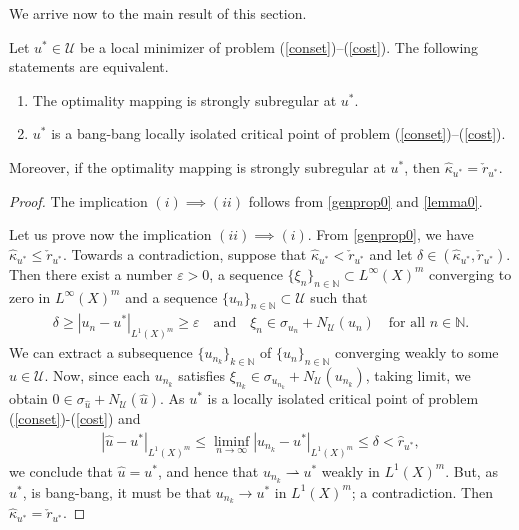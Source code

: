 \documentclass[hidelinks,onefignum,onetabnum]{siamart220329}
\begin{document}
We arrive now to the main result of this section. 
\begin{theorem}\label{subregthm}
	Let $u^*\in\mathcal U$ be a local minimizer of problem (\ref{conset})--(\ref{cost}). The following statements are equivalent.
	\begin{enumerate}
		\item The optimality mapping is strongly subregular at $u^*$.
		
		\item  $u^*$ is a bang-bang locally isolated critical point of problem (\ref{conset})--(\ref{cost}).
	\end{enumerate}
Moreover, if the optimality mapping is strongly subregular at $u^*$, then $\hat\kappa_{u^*}=\check r_{u^*}$.
\end{theorem}
\begin{proof}
	The implication $(i)\implies(ii)$ follows from \cref{genprop0} and \cref{lemma0}.
	
	
	Let us prove now the implication  $(ii)\implies(i)$. From  \cref{genprop0}, we have $\hat \kappa_{u^*}\le \check r_{u^*}$.
	Towards a contradiction, suppose that  $\hat \kappa_{u^*}<\check r_{u^*}$ and let $\delta\in(\hat\kappa_{u^*},\check r_{u^*})$. Then there exist a  number $\varepsilon>0$, a sequence $\{\xi_{n}\}_{n\in\mathbb N}\subset L^\infty(X)^m $ converging to zero in $L^\infty(X)^m$ and a sequence  $\{u_{n}\}_{n\in\mathbb N}\subset\mathcal U$ such that 
	\begin{align*}
	\delta\ge|u_n-u^*|_{{L^1(X)^m}}\ge\varepsilon\quad\text{and}\quad \xi_n\in \sigma_{u_n}+N_{\mathcal U}(u_n)\quad\text{for all $n\in\mathbb N$.}
	\end{align*}
	We can extract a subsequence $\{u_{n_k}\}_{k\in\mathbb N}$ of  $\{u_n\}_{n\in\mathbb N}$ converging weakly to some $\hat u\in\mathcal U$. Now, since each $u_{n_k}$ satisfies $\xi_{n_k}\in\sigma_{u_{n_k}}+
	N_{\mathcal U}(u_{n_k})$, taking limit, we obtain $0\in\sigma_{\hat u}+N_{\mathcal U}(\hat u)$. As $u^*$ is a locally isolated critical point of problem (\ref{conset})-(\ref{cost}) and
	\begin{align*}
		|\hat u-u^*|_{{L^1(X)^m}}\le\liminf_{n\to\infty}|u_{n_k}-u^*|_{{L^1(X)^m}}\le \delta<\hat r_{u^*},
	\end{align*}
	we conclude that $\hat u=u^*$, and hence that $u_{n_k}\rightharpoonup u^*$ weakly in ${L^1(X)^m}$. But, as $u^*$, is bang-bang, it must be that $u_{n_k}\to u^*$ in ${L^1(X)^m}$; a contradiction. Then $\hat\kappa_{u^*}=\check r_{u^*}$.
\end{proof}
\end{document}
